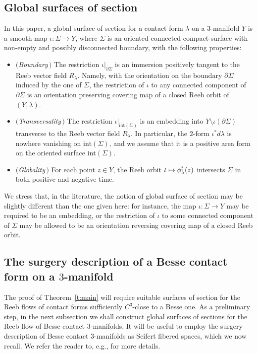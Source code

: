 \documentclass[11pt]{article}
\newcommand{\Subsection}{\subsection}
\numberwithin{equation}{section}
\newcommand\mto{\mathchoice{\longmapsto}{\mapsto}{\mapsto}{\mapsto}}
\theoremstyle{definition}
\let\diff d
\begin{document}
\subsection{Global surfaces of section}
\label{s:sos_def}
In this paper, a global surface of section for a contact form $\lambda$ on a $3$-manifold $Y$ is a smooth map $\iota:\Sigma\to Y$, where $\Sigma$ is an oriented connected compact surface with non-empty and possibly disconnected boundary, with the following properties:
\begin{itemize}

\item \textit{$($Boundary$\,)$} The restriction $\iota|_{\partial\Sigma}$ is an immersion positively tangent to the Reeb vector field $R_{\lambda}$. Namely, with the orientation on the boundary $\partial\Sigma$ induced by the one of $\Sigma$,
the restriction of $\iota$ to any connected component of $\partial\Sigma$ is an orientation preserving covering map of a closed Reeb orbit of $(Y,\lambda)$.\vspace{2pt}

\item \textit{$($Transversality$\,)$} The restriction $\iota|_{\mathrm{int}(\Sigma)}$ is an embedding into $Y\setminus\iota(\partial\Sigma)$ transverse to the Reeb vector field $R_\lambda$.
In particular, the $2$-form $\iota^*\diff\lambda$ is nowhere vanishing on $\mathrm{int}(\Sigma)$, and we assume that it is a positive area form on the oriented surface $\mathrm{int}(\Sigma)$.\vspace{2pt}

\item \textit{$($Globality$\,)$} For each point $z\in Y$, the Reeb orbit $t\mto\phi_\lambda^t(z)$ intersects $\Sigma$ in both positive and negative time.

\end{itemize}
We stress that, in the literature, the notion of global surface of section may be slightly different than the one given here: for instance, the map $\iota:\Sigma\to Y$ may be required to be an embedding, or the restriction of $\iota$ to some connected component of $\Sigma$ may be allowed to be an orientation reversing covering map of a closed Reeb orbit.

\Subsection{The surgery description of a Besse contact form on a $3$-manifold}
\label{s:surgery}

The proof of Theorem~\ref{t:main} will require suitable surfaces of section for the Reeb flows of contact forms sufficiently $C^3$-close to a Besse one. As a preliminary step, in the next subsection we shall construct global surfaces of sections for the Reeb flow of Besse contact $3$-manifolds. It will be useful to employ the surgery description of Besse contact $3$-manifolds as Seifert fibered spaces, which we now recall. We refer the reader to, e.g., \cite{Orlik:1972ts,Jankins:1983zm} for more details.
\end{document}
